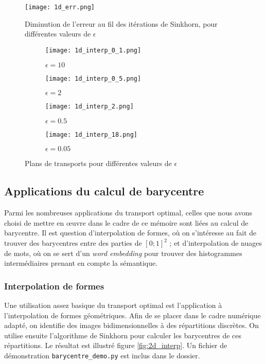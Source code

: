 \begin{figure}
\centering
\texttt{[image: 1d\_err.png]}
\caption{Diminution de l'erreur au fil des itérations de Sinkhorn, pour différentes valeurs de $\epsilon$}
\label{fig:1d_cv}
\end{figure}

\begin{figure}
\centering
\begin{subfigure}[b]{5cm}
\texttt{[image: 1d\_interp\_0\_1.png]}
\caption{$\epsilon=10$}
\end{subfigure}
%
\begin{subfigure}[b]{5cm}
\texttt{[image: 1d\_interp\_0\_5.png]}
\caption{$\epsilon=2$}
\end{subfigure}
%
\begin{subfigure}[b]{5cm}
\texttt{[image: 1d\_interp\_2.png]}
\caption{$\epsilon=0.5$}
\end{subfigure}
%
\begin{subfigure}[b]{5cm}
\texttt{[image: 1d\_interp\_18.png]}
\caption{$\epsilon=0.05$}
\end{subfigure}
%
\caption{Plans de transports pour différentes valeurs de $\epsilon$}
\label{fig:1d_maps}
\end{figure}

\subsection{Applications du calcul de barycentre}

Parmi les nombreuses applications du transport optimal, celles que nous avons choisi de mettre en \oe uvre dans le cadre de ce mémoire sont liées au calcul de barycentre. Il est question d'interpolation de formes, où on s'intéresse au fait de trouver des barycentres entre des parties de $[0;1]^2$ ; et d'interpolation de nuages de mots, où on se sert d'un \emph{word embedding} pour trouver des histogrammes intermédiaires prenant en compte la sémantique.

\subsubsection{Interpolation de formes}
Une utilisation assez basique du transport optimal est l'application à l'interpolation de formes géométriques. 
Afin de se placer dans le cadre numérique adapté, on identifie des images bidimensionnelles à des répartitions discrètes.
On utilise ensuite l'algorithme de Sinkhorn pour calculer les barycentres de ces répartitions.
Le résultat est illustré figure \ref{fig:2d_interp}.
Un fichier de démonstration \texttt{barycentre\_demo.py} est inclus dans le dossier.

